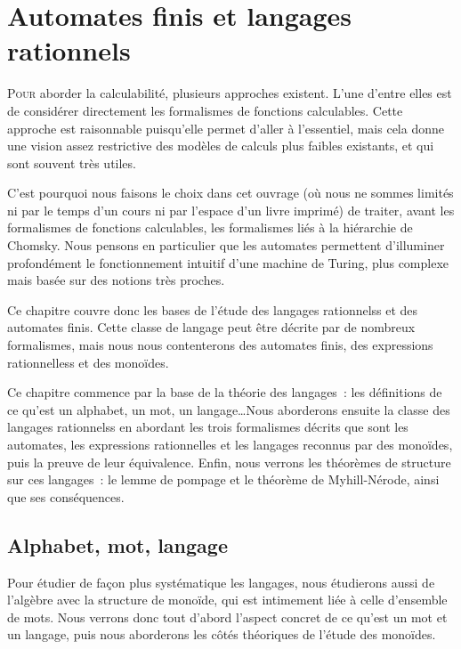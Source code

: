 \chapter[Langages rationnels]{Automates finis et langages rationnels}
\label{chp.auto}

\minitoc

\lettrine{P}{our} aborder la calculabilité, plusieurs approches existent. L'une
d'entre elles est de considérer directement les formalismes de fonctions
calculables. Cette approche est raisonnable puisqu'elle permet d'aller à
l'essentiel, mais cela donne une vision assez restrictive des modèles de calculs
plus faibles existants, et qui sont souvent très utiles.

C'est pourquoi nous faisons le choix dans cet ouvrage (où nous ne sommes limités
ni par le temps d'un cours ni par l'espace d'un livre imprimé) de traiter, avant
les formalismes de fonctions calculables, les formalismes liés à la hiérarchie
de Chomsky. Nous pensons en particulier que les automates permettent d'illuminer
profondément le fonctionnement intuitif d'une machine de Turing, plus complexe
mais basée sur des notions très proches.

Ce chapitre couvre donc les bases de l'étude des langages rationnelss et des
automates finis. Cette classe de langage peut être décrite par de nombreux
formalismes, mais nous nous contenterons des automates finis, des expressions
rationnelless et des monoïdes.

Ce chapitre commence par la base de la théorie des langages~: les définitions
de ce qu'est un alphabet, un mot, un langage\ldots Nous aborderons ensuite la
classe des langages rationnelss en abordant les trois formalismes décrits que
sont les automates, les expressions rationnelles et les langages reconnus par
des monoïdes, puis la preuve de leur équivalence. Enfin, nous verrons les
théorèmes de structure sur ces langages~: le lemme de pompage et le théorème de
Myhill-Nérode, ainsi que ses conséquences.

\section{Alphabet, mot, langage}

Pour étudier de façon plus systématique les langages, nous étudierons aussi de
l'algèbre avec la structure de monoïde, qui est intimement liée à celle
d'ensemble de mots. Nous verrons donc tout d'abord l'aspect concret de ce qu'est
un mot et un langage, puis nous aborderons les côtés théoriques de l'étude des
monoïdes.

